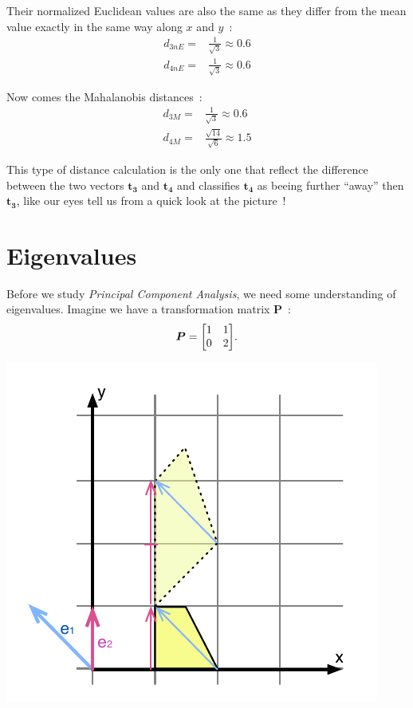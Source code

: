 \documentclass[11pt,twocolumn]{amsart} %
\newcommand{\ve}[1]{\boldsymbol{#1}}
\newcommand{\ma}[1]{\boldsymbol{#1}}
\newenvironment{m}{\begin{bmatrix}}{\end{bmatrix}}
\begin{document}
Their normalized Euclidean values are also the same as they differ from the mean value exactly in the same way along $x$ and $y$~:
\begin{align*}
  d_{3nE} = & \frac{1}{\sqrt{3}} \approx 0.6\\
  d_{4nE} = & \frac{1}{\sqrt{3}} \approx 0.6
\end{align*}

Now comes the Mahalanobis distances~:
\begin{align*}
  d_{3M} = & \frac{1}{\sqrt{3}} \approx 0.6\\
  d_{4M} = & \frac{\sqrt{14}}{\sqrt{6}} \approx 1.5
\end{align*}

This type of distance calculation is the only one that reflect the difference between the two vectors $\ve{t_3}$ and $\ve{t_4}$ and classifies $\ve{t_4}$ as beeing further ``away'' then $\ve{t_3}$, like our eyes tell us from a quick look at the picture~!

\section{Eigenvalues}

Before we study \emph{Principal Component Analysis}, we need some understanding of eigenvalues. Imagine we have a transformation matrix $\ma{P}$~:
\[
  \ma{P} = \begin{m} 1 & 1 \\ 0 & 2 \end{m}.
\]

\includegraphics{eigen.pdf}
\end{document}

